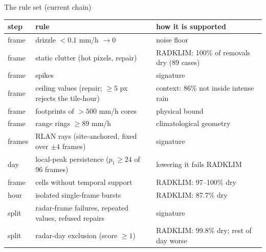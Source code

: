 \documentclass[aspectratio=169,10pt]{beamer}
\begin{document}
\begin{frame}{The rule set (current chain)}
  \footnotesize
  \begin{tabular}{lll}
    \toprule
    step & rule & how it is supported \\
    \midrule
    frame & drizzle $<0.1$ mm/h $\to 0$ & noise floor \\
    frame & static clutter (hot pixels, repair) & RADKLIM: 100\% of removals dry (89 cases) \\
    frame & spikes & signature \\
    frame & ceiling values (repair; $\ge 5$ px rejects the tile-hour) & context: 86\% not inside intense rain \\
    frame & footprints of $>500$ mm/h cores & physical bound \\
    frame & range rings $\ge 89$ mm/h & climatological geometry \\
    frames & RLAN rays (site-anchored, fixed over $\pm 4$ frames) & signature \\
    day & local-peak persistence ($p_1 \ge 24$ of 96 frames) & lowering it fails RADKLIM \\
    frame & cells without temporal support & RADKLIM: 97--100\% dry \\
    hour & isolated single-frame bursts & RADKLIM: 87.7\% dry \\
    split & radar-frame failures, repeated values, refused repairs & signature \\
    split & radar-day exclusion (score $\ge 1$) & RADKLIM: 99.8\% dry; rest of day worse \\
    \bottomrule
  \end{tabular}
\end{frame}
\end{document}
